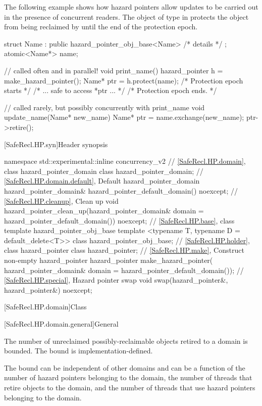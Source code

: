 \begin{example} The following example shows how hazard pointers allow updates to be carried out in the presence of concurrent readers. The object of type  in  protects the object  from being reclaimed by  until the end of the protection epoch.

\begin{codeblock}
struct Name : public hazard_pointer_obj_base<Name> { /* details */ };
atomic<Name*> name;

// called often and in parallel!
void print_name() {
  hazard_pointer h = make_hazard_pointer();
  Name* ptr = h.protect(name); /* Protection epoch starts */
  /* ... safe to access *ptr ... */
} /* Protection epoch ends. */

// called rarely, but possibly concurrently with print_name
void update_name(Name* new_name) {
  Name* ptr = name.exchange(new_name);
  ptr->retire();
}
\end{codeblock}
\end{example}

[SafeRecl.HP.syn]{Header  synopsis}

\begin{codeblock}
namespace std::experimental::inline concurrency_v2 {
  // \ref{SafeRecl.HP.domain}, class hazard_pointer_domain
  class hazard_pointer_domain;
  // \ref{SafeRecl.HP.domain.default}, Default hazard_pointer_domain
  hazard_pointer_domain& hazard_pointer_default_domain() noexcept;
  // \ref{SafeRecl.HP.cleanup}, Clean up
  void hazard_pointer_clean_up(hazard_pointer_domain& domain = hazard_pointer_default_domain())
    noexcept;
  // \ref{SafeRecl.HP.base}, class template hazard_pointer_obj_base
  template <typename T, typename D = default_delete<T>> class hazard_pointer_obj_base;
  // \ref{SafeRecl.HP.holder}, class hazard_pointer
  class hazard_pointer;
  // \ref{SafeRecl.HP.make}, Construct non-empty hazard_pointer
  hazard_pointer make_hazard_pointer(
    hazard_pointer_domain& domain = hazard_pointer_default_domain());
  // \ref{SafeRecl.HP.special}, Hazard pointer swap
  void swap(hazard_pointer&, hazard_pointer&) noexcept;
}
\end{codeblock}

[SafeRecl.HP.domain]{Class }

[SafeRecl.HP.domain.general]{General}

\pnum
The number of unreclaimed possibly-reclaimable objects retired to a domain is bounded.
The bound is implementation-defined. \begin{note} The bound can be independent of other
domains and can be a function of the number of hazard pointers belonging to the
domain, the number of threads that retire objects to the domain, and the number of
threads that use hazard pointers belonging to the domain. \end{note}

